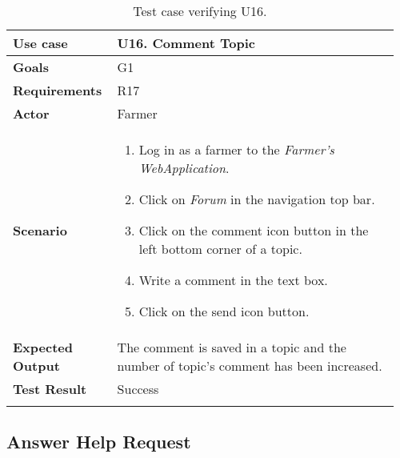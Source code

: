 \begin{longtable}{@{}p{0.25\linewidth}p{0.71\linewidth}@{}}
	\toprule
	\textbf{Use case} & \textbf{U16.} Comment Topic \\
	\midrule
	\textbf{Goals} & G1\\
	\midrule
	\textbf{Requirements} & R17\\
	\midrule
	\textbf{Actor} & Farmer\\
	\midrule
	\textbf{Scenario} & \begin{enumerate}[leftmargin=.4cm,noitemsep,topsep=0pt,before=\vspace{-3mm},after=\vspace{-4mm}]
		\item Log in as a farmer to the \textit{Farmer's WebApplication}.
		\item Click on \textit{Forum} in the navigation top bar.
		\item Click on the comment icon button in the left bottom corner of a topic.
		\item Write a comment in the text box.
		\item Click on the send icon button.
	\end{enumerate}\\
	\midrule
	\textbf{Expected Output} & The comment is saved in a topic and the number of topic's comment has been increased.\\
	\midrule
	\textbf{Test Result} & Success\\
	\bottomrule
	\caption{Test case verifying U16.}
\end{longtable}


\subsection{Answer Help Request}

